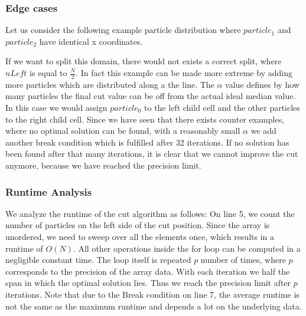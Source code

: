 \documentclass[]{article}
\begin{document}
\subsubsection{Edge cases}

Let us consider the following example particle distribution where $particle_1$ and $particle_2$ have identical x coordinates. 

\begin{figure}[H]
	\begin{center}
	\end{center}
\end{figure}

If we want to split this domain, there would not exists a correct split, where $nLeft$ is equal to $\frac{N}{2}$. In fact this example can be made more extreme by adding more particles which are distributed along a the line.
The $\alpha$ value defines by how many particles the final cut value can be off from the actual ideal median value. In this case we would assign $particle_0$ to the left child cell and the other particles to the right child cell. Since we have seen that there exists counter examples, where no optimal solution can be found, with a reasonably small $\alpha$ we add another break condition which is fulfilled after 32 iterations. If no solution has been found after that many iterations, it is clear that we cannot improve the cut anymore, because we have reached the precision limit.

\subsubsection{Runtime Analysis}

We analyze the runtime of the cut algorithm as follows: On line 5, we count the number of particles on the left side of the cut position. Since the array is unordered, we need to sweep over all the elements once, which results in a runtime of $O(N)$. All other operations inside the for loop can be computed in a negligible constant time. The loop itself is repeated $p$ number of times, where $p$ corresponds to the precision of the array data. With each iteration we half the span in which the optimal solution lies. Thus we reach the precision limit after $p$ iterations. Note that due to the Break condition on line 7, the average runtime is not the same as the maximum runtime and depends a lot on the underlying data.
\end{document}
